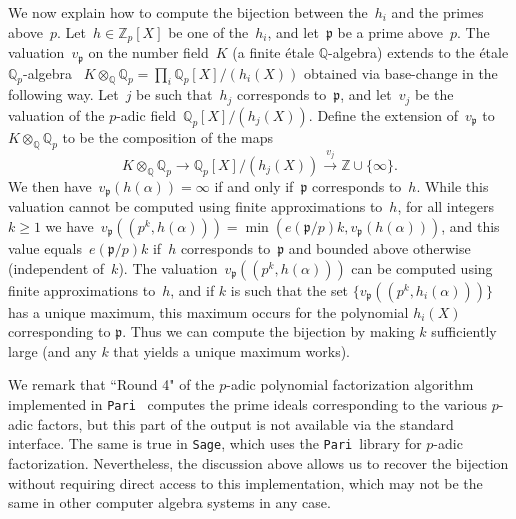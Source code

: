 \documentclass{article}
\def\Sage{{\tt Sage}}
\def\Pari{{\tt Pari}}
\def\Z{{\mathbb Z}}
\def\Q{{\mathbb Q}}
\def\p{{\mathfrak p}}
\begin{document}
We now explain how to compute the bijection between the~$h_i$ and the primes
above~$p$. Let~$h\in\Z_p[X]$ be one of the~$h_i$, and let~$\p$ be a prime
above~$p$. The valuation~$v_{\p}$ on the number field~$K$ (a finite \'etale $\Q$-algebra) extends to the \'etale $\Q_p$-algebra ~$K\otimes_{\Q}\Q_p = \prod_i
\Q_p[X]/(h_i(X))$ obtained via base-change in the following way.
Let~$j$ be such that~$h_{j}$ corresponds
to~$\p$, and let~$v_j$ be the valuation of the $p$-adic field~$\Q_p[X]/(h_j(X))$.
Define the extension of~$v_\p$ to $K\otimes_\Q\Q_p$ to be the composition of the maps
\[
  K\otimes_{\Q}\Q_p \longrightarrow \Q_p[X]/(h_j(X)) \stackrel{v_j}{\longrightarrow} \Z\cup\{\infty\}.
\]
We then have~$v_{\p}(h(\alpha)) = \infty$ if and only
if~$\p$ corresponds to~$h$.
While this valuation cannot be computed using finite
approximations to~$h$, for all integers~$k\ge 1$ we have~$v_\p((p^k,h(\alpha)))
= \min(e(\p/p)k, v_\p(h(\alpha)))$, and this value equals~$e(\p/p)k$
if~$h$ corresponds to~$\p$ and bounded above otherwise (independent of~$k$). The
valuation~$v_\p((p^k,h(\alpha)))$ can be computed using finite approximations
to~$h$, and if $k$ is such that the set $\{v_\p((p^k,h_i(\alpha)))\}$ has a unique maximum, this maximum occurs for the polynomial $h_i(X)$ corresponding to $\p$.
Thus we can compute the bijection by making $k$ sufficiently large (and any $k$ that yields a unique maximum works).

We remark that ``Round 4" of the $p$-adic polynomial factorization
algorithm implemented in \Pari\ \cite{Roblot} computes the prime
ideals corresponding to the various $p$-adic factors, but this part of
the output is not available via the standard interface.  The same is
true in \Sage, which uses the \Pari\ library for $p$-adic
factorization.  Nevertheless, the discussion above allows us to
recover the bijection without requiring direct access to this
implementation, which may not be the same in other computer algebra
systems in any case.
\end{document}
